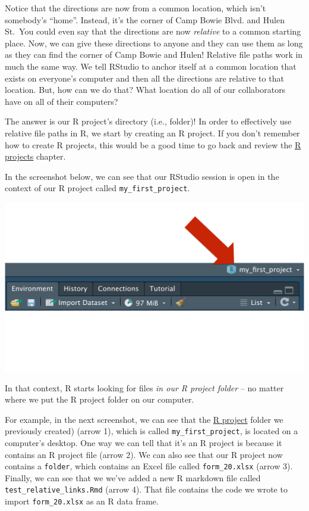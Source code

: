 \documentclass[
  letterpaper,
  DIV=11,
  numbers=noendperiod]{scrreprt}
\begin{document}
Notice that the directions are now from a common location, which isn't
somebody's ``home''. Instead, it's the corner of Camp Bowie Blvd. and
Hulen St.~You could even say that the directions are now \emph{relative}
to a common starting place. Now, we can give these directions to anyone
and they can use them as long as they can find the corner of Camp Bowie
and Hulen! Relative file paths work in much the same way. We tell
RStudio to anchor itself at a common location that exists on everyone's
computer and then all the directions are relative to that location. But,
how can we do that? What location do all of our collaborators have on
all of their computers?

The answer is our R project's directory (i.e., folder)! In order to
effectively use relative file paths in R, we start by creating an R
project. If you don't remember how to create R projects, this would be a
good time to go back and review the \hyperref[r-projects]{R projects}
chapter.

In the screenshot below, we can see that our RStudio session is open in
the context of our R project called \texttt{my\_first\_project}.

\includegraphics{chapters/file_paths/relative_file_paths_03_check_project.png}

In that context, R starts looking for files \emph{in our R project
folder} -- no matter where we put the R project folder on our computer.

For example, in the next screenshot, we can see that the
\href{../r_projects/projects.qmd}{R project} folder we previously
created) (arrow 1), which is called \texttt{my\_first\_project}, is
located on a computer's desktop. One way we can tell that it's an R
project is because it contains an R project file (arrow 2). We can also
see that our R project now contains a \texttt{folder}, which contains an
Excel file called \texttt{form\_20.xlsx} (arrow 3). Finally, we can see
that we we've added a new R markdown file called
\texttt{test\_relative\_links.Rmd} (arrow 4). That file contains the
code we wrote to import \texttt{form\_20.xlsx} as an R data frame.
\end{document}

